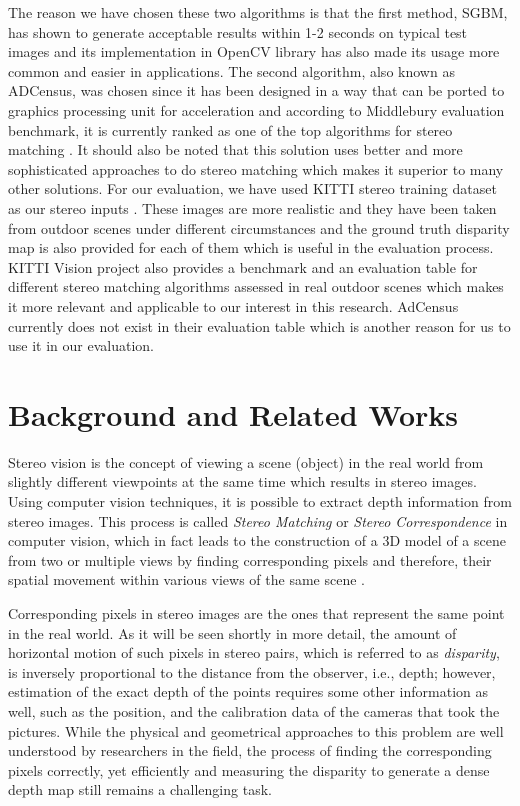 \documentclass[dvips,letterpaper,12pt]{report}
\begin{document}
The reason we have chosen these two algorithms is that the first method, SGBM, has shown to generate acceptable results within 1-2 seconds on typical test images \cite{hir08} and 
its implementation in OpenCV library has also made its usage more common and easier in applications. The second algorithm, also known as ADCensus, was chosen since it has been designed in a way that
can be ported to graphics processing unit for acceleration and according to Middlebury evaluation benchmark, it is currently ranked as one of the top algorithms for stereo matching \cite{mideval}.
It should also be noted that this solution uses better and more sophisticated approaches to do stereo matching which makes it superior to many other solutions. \newline
For our evaluation, we have used KITTI stereo training dataset as our stereo inputs \cite{kitti}. 
These images are more realistic and they have been taken from outdoor scenes under different circumstances 
and the ground truth disparity map is also provided for each of them which is useful in the evaluation process. KITTI Vision project also provides a benchmark and an evaluation table
for different stereo
matching algorithms assessed in real outdoor scenes which makes it more relevant and applicable to our interest in this research. 
AdCensus currently does not exist in their evaluation table which is another reason for us to use it in our evaluation.


\chapter{Background and Related Works}
Stereo vision is the concept of viewing a scene (object) in the real world from slightly different
viewpoints at the same time which results in stereo images. Using computer vision techniques, it is possible to extract depth information from stereo
images. This process is called {\it Stereo Matching} or {\it Stereo Correspondence} in computer vision,
which in fact leads to the construction of a
3D model of a scene from two or multiple views by finding corresponding pixels and therefore, their spatial movement within various views of the same scene \cite{sze11}.

Corresponding pixels in stereo images are the ones that represent the same point in the real
world. As it will be seen shortly in more detail, the amount of horizontal motion of such pixels
in stereo pairs, which is referred to as {\it disparity}, is inversely proportional to the
distance from the observer, i.e., depth; however,  estimation of the exact depth of the points requires some
other information as well, such as the position, and the calibration data of the cameras that took the pictures.
While the physical and geometrical approaches to this problem are well understood by researchers in the field, the process of finding the corresponding pixels correctly, yet efficiently
and measuring the disparity to generate a dense depth map still remains a challenging task. \newline
\end{document}
